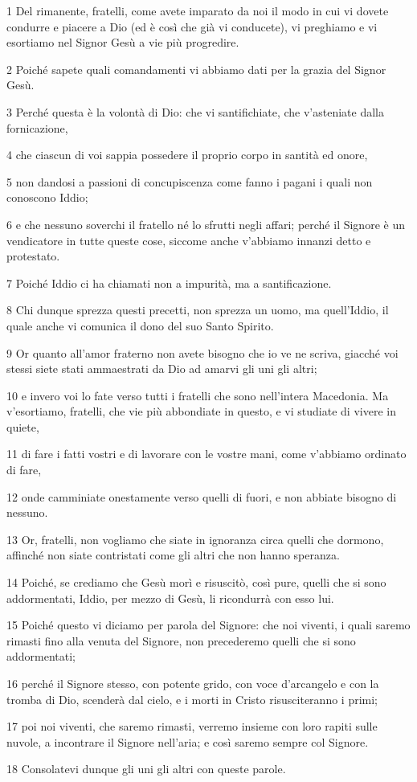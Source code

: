 \par 1 Del rimanente, fratelli, come avete imparato da noi il modo in cui vi dovete condurre e piacere a Dio (ed è così che già vi conducete), vi preghiamo e vi esortiamo nel Signor Gesù a vie più progredire.
\par 2 Poiché sapete quali comandamenti vi abbiamo dati per la grazia del Signor Gesù.
\par 3 Perché questa è la volontà di Dio: che vi santifichiate, che v'asteniate dalla fornicazione,
\par 4 che ciascun di voi sappia possedere il proprio corpo in santità ed onore,
\par 5 non dandosi a passioni di concupiscenza come fanno i pagani i quali non conoscono Iddio;
\par 6 e che nessuno soverchi il fratello né lo sfrutti negli affari; perché il Signore è un vendicatore in tutte queste cose, siccome anche v'abbiamo innanzi detto e protestato.
\par 7 Poiché Iddio ci ha chiamati non a impurità, ma a santificazione.
\par 8 Chi dunque sprezza questi precetti, non sprezza un uomo, ma quell'Iddio, il quale anche vi comunica il dono del suo Santo Spirito.
\par 9 Or quanto all'amor fraterno non avete bisogno che io ve ne scriva, giacché voi stessi siete stati ammaestrati da Dio ad amarvi gli uni gli altri;
\par 10 e invero voi lo fate verso tutti i fratelli che sono nell'intera Macedonia. Ma v'esortiamo, fratelli, che vie più abbondiate in questo, e vi studiate di vivere in quiete,
\par 11 di fare i fatti vostri e di lavorare con le vostre mani, come v'abbiamo ordinato di fare,
\par 12 onde camminiate onestamente verso quelli di fuori, e non abbiate bisogno di nessuno.
\par 13 Or, fratelli, non vogliamo che siate in ignoranza circa quelli che dormono, affinché non siate contristati come gli altri che non hanno speranza.
\par 14 Poiché, se crediamo che Gesù morì e risuscitò, così pure, quelli che si sono addormentati, Iddio, per mezzo di Gesù, li ricondurrà con esso lui.
\par 15 Poiché questo vi diciamo per parola del Signore: che noi viventi, i quali saremo rimasti fino alla venuta del Signore, non precederemo quelli che si sono addormentati;
\par 16 perché il Signore stesso, con potente grido, con voce d'arcangelo e con la tromba di Dio, scenderà dal cielo, e i morti in Cristo risusciteranno i primi;
\par 17 poi noi viventi, che saremo rimasti, verremo insieme con loro rapiti sulle nuvole, a incontrare il Signore nell'aria; e così saremo sempre col Signore.
\par 18 Consolatevi dunque gli uni gli altri con queste parole.

